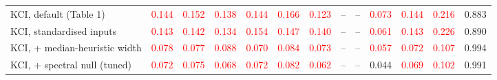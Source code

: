 \begin{tabular}{lcccccccccccc}
    \midrule
    KCI, default (Table 1)               & \textcolor{red}{0.144} & \textcolor{red}{0.152} & \textcolor{red}{0.138} & \textcolor{red}{0.144} & \textcolor{red}{0.166} & \textcolor{red}{0.123} & -- & -- & \textcolor{red}{0.073} & \textcolor{red}{0.144} & \textcolor{red}{0.216} & 0.883 \\
    KCI, standardised inputs             & \textcolor{red}{0.143} & \textcolor{red}{0.142} & \textcolor{red}{0.134} & \textcolor{red}{0.154} & \textcolor{red}{0.147} & \textcolor{red}{0.140} & -- & -- & \textcolor{red}{0.061} & \textcolor{red}{0.143} & \textcolor{red}{0.226} & 0.890 \\
    KCI, + median-heuristic width        & \textcolor{red}{0.078} & \textcolor{red}{0.077} & \textcolor{red}{0.088} & \textcolor{red}{0.070} & \textcolor{red}{0.084} & \textcolor{red}{0.073} & -- & -- & \textcolor{red}{0.057} & \textcolor{red}{0.072} & \textcolor{red}{0.107} & 0.994 \\
    KCI, + spectral null (tuned)         & \textcolor{red}{0.072} & \textcolor{red}{0.075} & \textcolor{red}{0.068} & \textcolor{red}{0.072} & \textcolor{red}{0.082} & \textcolor{red}{0.062} & -- & -- & 0.044 & \textcolor{red}{0.069} & \textcolor{red}{0.102} & 0.991 \\
    \bottomrule
\end{tabular}
